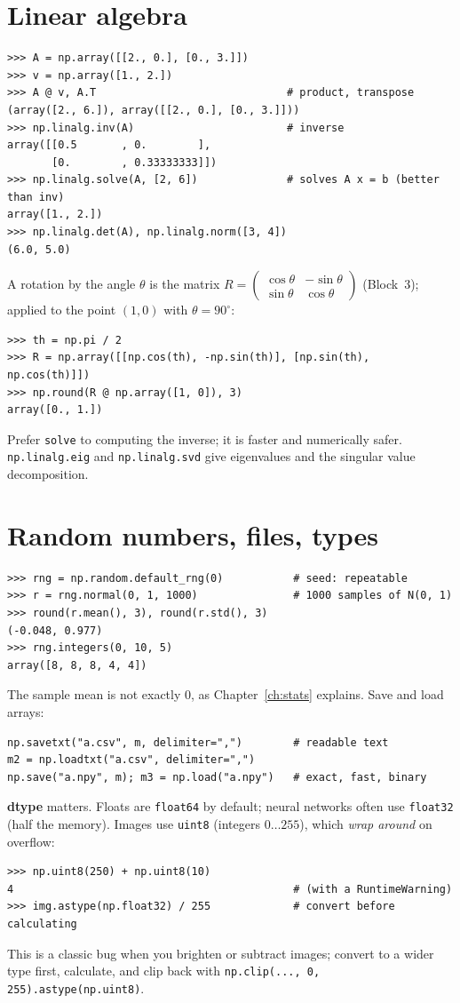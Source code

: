 \section*{Linear algebra}
\begin{verbatim}
>>> A = np.array([[2., 0.], [0., 3.]])
>>> v = np.array([1., 2.])
>>> A @ v, A.T                              # product, transpose
(array([2., 6.]), array([[2., 0.], [0., 3.]]))
>>> np.linalg.inv(A)                        # inverse
array([[0.5       , 0.        ],
       [0.        , 0.33333333]])
>>> np.linalg.solve(A, [2, 6])              # solves A x = b (better than inv)
array([1., 2.])
>>> np.linalg.det(A), np.linalg.norm([3, 4])
(6.0, 5.0)
\end{verbatim}
A rotation by the angle $\theta$ is the matrix $R=\begin{pmatrix}\cos\theta&-\sin\theta\\ \sin\theta&\cos\theta\end{pmatrix}$ (Block~3); applied to the point $(1,0)$ with $\theta=90^\circ$:
\begin{verbatim}
>>> th = np.pi / 2
>>> R = np.array([[np.cos(th), -np.sin(th)], [np.sin(th), np.cos(th)]])
>>> np.round(R @ np.array([1, 0]), 3)
array([0., 1.])
\end{verbatim}
Prefer \texttt{solve} to computing the inverse; it is faster and numerically safer. \texttt{np.linalg.eig} and \texttt{np.linalg.svd} give eigenvalues and the singular value decomposition.

\section*{Random numbers, files, types}
\begin{verbatim}
>>> rng = np.random.default_rng(0)           # seed: repeatable
>>> r = rng.normal(0, 1, 1000)               # 1000 samples of N(0, 1)
>>> round(r.mean(), 3), round(r.std(), 3)
(-0.048, 0.977)
>>> rng.integers(0, 10, 5)
array([8, 8, 8, 4, 4])
\end{verbatim}
The sample mean is not exactly $0$, as Chapter~\ref{ch:stats} explains. Save and load arrays:
\begin{verbatim}
np.savetxt("a.csv", m, delimiter=",")        # readable text
m2 = np.loadtxt("a.csv", delimiter=",")
np.save("a.npy", m); m3 = np.load("a.npy")   # exact, fast, binary
\end{verbatim}
\textbf{dtype} matters. Floats are \texttt{float64} by default; neural networks often use \texttt{float32} (half the memory). Images use \texttt{uint8} (integers $0\dots255$), which \emph{wrap around} on overflow:
\begin{verbatim}
>>> np.uint8(250) + np.uint8(10)
4                                            # (with a RuntimeWarning)
>>> img.astype(np.float32) / 255             # convert before calculating
\end{verbatim}
This is a classic bug when you brighten or subtract images; convert to a wider type first, calculate, and clip back with \texttt{np.clip(..., 0, 255).astype(np.uint8)}.

